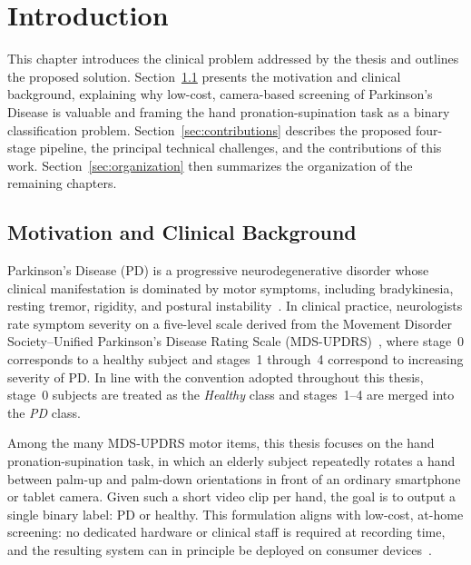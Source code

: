 
\chapter{Introduction}
\label{chap:intro}

This chapter introduces the clinical problem addressed by the thesis and outlines the proposed solution. Section~\ref{sec:motivation} presents the motivation and clinical background, explaining why low-cost, camera-based screening of Parkinson's Disease is valuable and framing the hand pronation-supination task as a binary classification problem. Section~\ref{sec:contributions} describes the proposed four-stage pipeline, the principal technical challenges, and the contributions of this work. Section~\ref{sec:organization} then summarizes the organization of the remaining chapters.

\section{Motivation and Clinical Background}
\label{sec:motivation}

Parkinson's Disease (PD) is a progressive neurodegenerative disorder whose clinical manifestation is dominated by motor symptoms, including bradykinesia, resting tremor, rigidity, and postural instability~\cite{bloem2021pd, dorsey2018global}. In clinical practice, neurologists rate symptom severity on a five-level scale derived from the Movement Disorder Society--Unified Parkinson's Disease Rating Scale (MDS-UPDRS)~\cite{goetz2008movement}, where stage~0 corresponds to a healthy subject and stages~1 through~4 correspond to increasing severity of PD. In line with the convention adopted throughout this thesis, stage~0 subjects are treated as the \emph{Healthy} class and stages~1--4 are merged into the \emph{PD} class.

Among the many MDS-UPDRS motor items, this thesis focuses on the hand pronation-supination task, in which an elderly subject repeatedly rotates a hand between palm-up and palm-down orientations in front of an ordinary smartphone or tablet camera. Given such a short video clip per hand, the goal is to output a single binary label: PD or healthy. This formulation aligns with low-cost, at-home screening: no dedicated hardware or clinical staff is required at recording time, and the resulting system can in principle be deployed on consumer devices~\cite{little2009dysphonia, bot2016mpower}.

